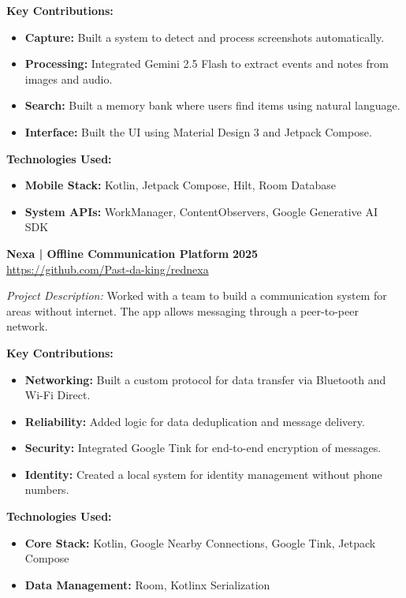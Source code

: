 \documentclass[a4paper,10pt]{article}
\begin{document}
\textbf{Key Contributions:}
\begin{itemize}
    \item \textbf{Capture:} Built a system to detect and process screenshots automatically.
    \item \textbf{Processing:} Integrated Gemini 2.5 Flash to extract events and notes from images and audio.
    \item \textbf{Search:} Built a memory bank where users find items using natural language.
    \item \textbf{Interface:} Built the UI using Material Design 3 and Jetpack Compose.
\end{itemize}

\textbf{Technologies Used:}
\begin{itemize}
    \item \textbf{Mobile Stack:} Kotlin, Jetpack Compose, Hilt, Room Database
    \item \textbf{System APIs:} WorkManager, ContentObservers, Google Generative AI SDK
\end{itemize}

\vspace{8pt}

\textbf{Nexa | Offline Communication Platform} \hfill \textbf{2025}\\
\small\url{https://github.com/Past-da-king/rednexa}

\textit{Project Description:} 
Worked with a team to build a communication system for areas without internet. The app allows messaging through a peer-to-peer network.

\textbf{Key Contributions:}
\begin{itemize}
    \item \textbf{Networking:} Built a custom protocol for data transfer via Bluetooth and Wi-Fi Direct.
    \item \textbf{Reliability:} Added logic for data deduplication and message delivery.
    \item \textbf{Security:} Integrated Google Tink for end-to-end encryption of messages.
    \item \textbf{Identity:} Created a local system for identity management without phone numbers.
\end{itemize}

\textbf{Technologies Used:}
\begin{itemize}
    \item \textbf{Core Stack:} Kotlin, Google Nearby Connections, Google Tink, Jetpack Compose
    \item \textbf{Data Management:} Room, Kotlinx Serialization
\end{itemize}
\end{document}
